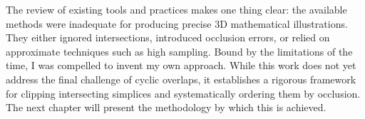 The review of existing tools and practices makes one thing clear: 
the available methods were inadequate for producing precise 
\(3\)D mathematical illustrations. They either ignored 
intersections, introduced occlusion errors, or relied on 
approximate techniques such as high sampling. Bound by the 
limitations of the time, I was compelled to invent my own 
approach. While this work does not yet address the final 
challenge of cyclic overlaps, it establishes a rigorous framework 
for clipping intersecting simplices and systematically ordering 
them by occlusion. The next chapter will present the methodology 
by which this is achieved.
